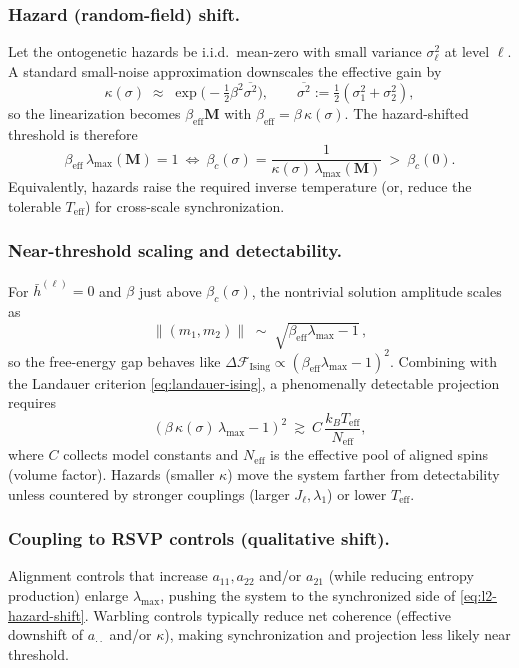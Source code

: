 \documentclass[a4paper,11pt]{article}
\begin{document}
\subsubsection{Hazard (random-field) shift.}
Let the ontogenetic hazards be i.i.d.\ mean-zero with small variance $\sigma_\ell^2$ at level $\ell$. A standard small-noise approximation downscales the effective gain by
\begin{equation}
\kappa(\sigma)\;\approx\;\exp\!\Big(-\tfrac{1}{2}\beta^2\overline{\sigma^2}\Big),\qquad
\overline{\sigma^2}:=\tfrac{1}{2}(\sigma_1^2+\sigma_2^2),
\end{equation}
so the linearization becomes $\beta_{\mathrm{eff}}\mathbf{M}$ with $\beta_{\mathrm{eff}}=\beta\,\kappa(\sigma)$. The hazard-shifted threshold is therefore
\begin{equation}
\label{eq:l2-hazard-shift}
\beta_{\mathrm{eff}}\,\lambda_{\max}(\mathbf{M})=1
\ \Longleftrightarrow\
\beta_c(\sigma)=\frac{1}{\kappa(\sigma)\,\lambda_{\max}(\mathbf{M})}
\ >\ \beta_c(0).
\end{equation}
Equivalently, hazards raise the required inverse temperature (or, reduce the tolerable $T_{\mathrm{eff}}$) for cross-scale synchronization.

\subsubsection{Near-threshold scaling and detectability.}
For $\bar h^{(\ell)}{=}0$ and $\beta$ just above $\beta_c(\sigma)$, the nontrivial solution amplitude scales as
\begin{equation}
\|(m_1,m_2)\| \;\sim\; \sqrt{\beta_{\mathrm{eff}}\lambda_{\max}-1}\,,
\end{equation}
so the free-energy gap behaves like
$\Delta\mathcal{F}_{\mathrm{Ising}}\propto(\beta_{\mathrm{eff}}\lambda_{\max}-1)^2$.
Combining with the Landauer criterion \eqref{eq:landauer-ising}, a phenomenally
detectable projection requires
\begin{equation}
(\beta\,\kappa(\sigma)\,\lambda_{\max}-1)^2 \ \gtrsim\ C\,\frac{k_B T_{\mathrm{eff}}}{N_{\mathrm{eff}}},
\end{equation}
where $C$ collects model constants and $N_{\mathrm{eff}}$ is the effective pool of aligned spins (volume factor). Hazards (smaller $\kappa$) move the system farther from detectability unless countered by stronger couplings (larger $J_\ell,\lambda_1$) or lower $T_{\mathrm{eff}}$.

\subsubsection{Coupling to RSVP controls (qualitative shift).}
Alignment controls that increase $a_{11},a_{22}$ and/or $a_{21}$ (while reducing entropy production) enlarge $\lambda_{\max}$, pushing the system to the synchronized side of \eqref{eq:l2-hazard-shift}. Warbling controls typically reduce net coherence (effective downshift of $a_{\cdot\cdot}$ and/or $\kappa$), making synchronization and projection less likely near threshold.
\end{document}
